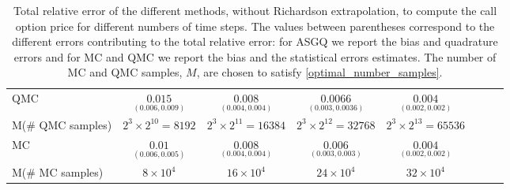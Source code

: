 \begin{table}[h!]
\begin{small}
\begin{tabular}{l*{6}{c}r}
			
			\hline
			QMC    & $\underset{(0.006,0.009)}{\mathbf{0.015}}$  & $\underset{(0.004,0.004)}{ \mathbf{0.008}}$  & $\underset{(0.003,0.0036)}{\mathbf{0.0066}}$ & $\underset{(0.002,0.002)}{\mathbf{0.004}}$  \\	
			M(\# QMC samples) 	& $2^3 \times 2^{10}= 8192$  &  $2^3 \times 2^{11}=  16384$ &  $2^3 \times 2^{12}= 32768$ & $2^3 \times 2^{13}= 65536	$  \\
			\hline
			MC    & $\underset{(0.006,0.005)}{\mathbf{0.01}}$  & $\underset{(0.004,0.004)}{ \mathbf{0.008}}$  & $\underset{(0.003,0.003)}{\mathbf{0.006}}$ & $\underset{(0.002,0.002)}{\mathbf{0.004}}$  \\	
			M(\# MC samples) 	& $8 \times 10^4$  & $16 \times 10^4$  & $24 \times 10^4$ & $32 \times 10^4$  \\
			\bottomrule[1.25pt]
		\end{tabular}
		\caption{Total relative error of  the different methods, without Richardson extrapolation,  to compute the call option price  for different numbers of time steps. The values between parentheses correspond to the different errors contributing to the total relative error: for ASGQ we report the bias and quadrature errors and for MC and QMC we report the bias and the statistical errors estimates. The number of MC and QMC  samples, $M$, are chosen to satisfy \eqref{optimal_number_samples}.}
		\label{Total error of MISC and MC to compute Call option price of the different tolerances for different number of time steps. Case set 4, without Richardson extrapolation. The numbers between parentheses are the corresponding absolute errors.}
	\end{small}
\end{table}


